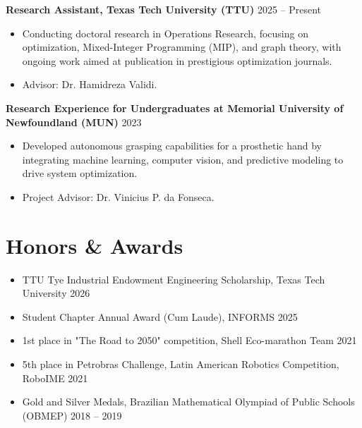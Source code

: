 \documentclass[a4paper,11pt]{article}
\begin{document}
\textbf{Research Assistant, Texas Tech University (TTU)} \hspace*{\fill} 2025 – Present
\vspace{-1mm}
\begin{itemize}[leftmargin=10pt]
    \item Conducting doctoral research in Operations Research, focusing on optimization, Mixed-Integer Programming (MIP), and graph theory, with ongoing work aimed at publication in prestigious optimization journals.
    \vspace{-1mm}
    \item Advisor: Dr. Hamidreza Validi.
\end{itemize}

\textbf{Research Experience for Undergraduates at Memorial University of Newfoundland (MUN)} \hspace*{\fill} 2023
\vspace{-1mm}
\begin{itemize}[leftmargin=10pt]
    \item Developed autonomous grasping capabilities for a prosthetic hand by integrating machine learning, computer vision, and predictive modeling to drive system optimization.
    \vspace{-1mm}
    \item Project Advisor: Dr. Vinicius P. da Fonseca.
\end{itemize}
\vspace{-2mm}


\section{\textbf{Honors \& Awards}}
\vspace{2mm}

\begin{itemize}[leftmargin=10pt]
    \item TTU Tye Industrial Endowment Engineering Scholarship, Texas Tech University \hspace*{\fill} 2026
    \item Student Chapter Annual Award (Cum Laude), INFORMS \hspace*{\fill} 2025
    \item 1st place in "The Road to 2050" competition, Shell Eco-marathon Team \hspace*{\fill} 2021
    \item 5th place in Petrobras Challenge, Latin American Robotics Competition, RoboIME \hspace*{\fill} 2021
    \item Gold and Silver Medals, Brazilian Mathematical Olympiad of Public Schools (OBMEP) \hspace*{\fill} 2018 – 2019
\end{itemize}
\end{document}
